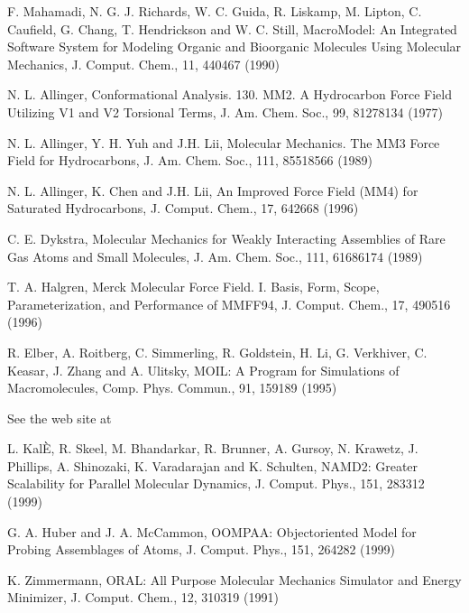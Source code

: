 \documentclass[letterpaper,11pt,english]{sphinxmanual}
\begin{document}
     F. Mahamadi, N. G. J. Richards, W. C. Guida, R. Liskamp, M. Lipton, C. Caufield, G. Chang, T. Hendrickson and W. C. Still, MacroModel: An Integrated Software System for Modeling Organic and Bioorganic Molecules Using Molecular Mechanics, J. Comput. Chem., 11, 440\sphinxhyphen{}467 (1990)

     N. L. Allinger, Conformational Analysis. 130. MM2. A Hydrocarbon Force Field Utilizing V1 and V2 Torsional Terms, J. Am. Chem. Soc., 99, 8127\sphinxhyphen{}8134 (1977)

     N. L. Allinger, Y. H. Yuh and J.\sphinxhyphen{}H. Lii, Molecular Mechanics. The MM3 Force Field for Hydrocarbons, J. Am. Chem. Soc., 111, 8551\sphinxhyphen{}8566 (1989)

     N. L. Allinger, K. Chen and J.\sphinxhyphen{}H. Lii, An Improved Force Field (MM4) for Saturated Hydrocarbons, J. Comput. Chem., 17, 642\sphinxhyphen{}668 (1996)

     C. E. Dykstra, Molecular Mechanics for Weakly Interacting Assemblies of Rare Gas Atoms and Small Molecules, J. Am. Chem. Soc., 111, 6168\sphinxhyphen{}6174 (1989)

     T. A. Halgren, Merck Molecular Force Field. I. Basis, Form, Scope, Parameterization, and Performance of MMFF94, J. Comput. Chem., 17, 490\sphinxhyphen{}516 (1996)

     R. Elber, A. Roitberg, C. Simmerling, R. Goldstein, H. Li, G. Verkhiver, C. Keasar, J. Zhang and A. Ulitsky, MOIL: A Program for Simulations of Macromolecules, Comp. Phys. Commun., 91, 159\sphinxhyphen{}189 (1995)

     See the web site at 

     L. KalÈ, R. Skeel, M. Bhandarkar, R. Brunner, A. Gursoy, N. Krawetz, J. Phillips, A. Shinozaki, K. Varadarajan and K. Schulten, NAMD2: Greater Scalability for Parallel Molecular Dynamics, J. Comput. Phys., 151, 283\sphinxhyphen{}312 (1999)

     G. A. Huber and J. A. McCammon, OOMPAA: Object\sphinxhyphen{}oriented Model for Probing Assemblages of Atoms, J. Comput. Phys., 151, 264\sphinxhyphen{}282 (1999)

     K. Zimmermann, ORAL: All Purpose Molecular Mechanics Simulator and Energy Minimizer, J. Comput. Chem., 12, 310\sphinxhyphen{}319 (1991)
\end{document}
